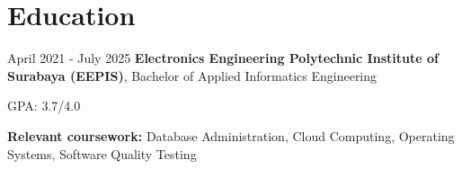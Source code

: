 \section{Education}

\begin{twocolentrydate}{
		April 2021 - July 2025
	}
	\textbf{Electronics Engineering Polytechnic Institute of Surabaya (EEPIS)}, Bachelor of Applied Informatics Engineering\end{twocolentrydate}

\vspace{0.10 cm}


\begin{onecolentry}
	\begin{highlights}
		\item GPA: 3.7/4.0
		\item \textbf{Relevant coursework:} Database Administration, Cloud Computing, Operating Systems, Software Quality Testing
	\end{highlights}
\end{onecolentry}
